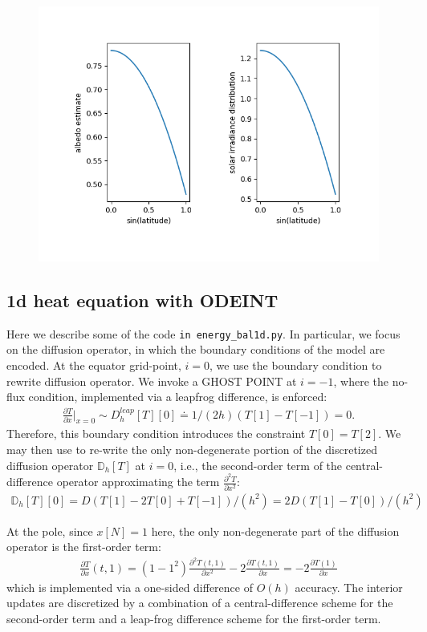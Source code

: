 \documentclass{article}
\theoremstyle{remark}
\newcommand{\D}{ \partial }
\begin{document}
\begin{figure}
\centering
\includegraphics{albedo_irradiance.png}
\end{figure}

\subsection{1d heat equation with ODEINT}

Here we describe some of the code \verb+in energy_bal1d.py+. In particular,
we focus on the diffusion operator, in which the boundary conditions of the
model are encoded. At the equator grid-point, $i=0$, we use the boundary 
condition to rewrite diffusion operator. We invoke a GHOST POINT at $i=-1$, 
where the no-flux condition, implemented via a leapfrog difference, is enforced:
\begin{align}
	\frac{\D T}{\D x}\Big|_{x=0} \sim D_h^{leap}[T][0] 
	\doteq 1/(2h)(T[1]-T[-1]) = 0.
\end{align}
Therefore, this boundary condition introduces the constraint 
$T[0] = T[2]$. We may then use to re-write the only non-degenerate
portion of the discretized diffusion operator $\mathbb{D}_h[T]$ at $i=0$, i.e., 
the second-order term of the central-difference operator approximating
the term $\frac{\D^2 T}{\D x^2}$:
\begin{align}
	\mathbb{D}_h[T][0] = D(T[1] - 2T[0] + T[-1])/(h^2)	
				= 2D(T[1] - T[0])/(h^2)
\end{align}

At the pole, since $x[N] = 1$ here, the only non-degenerate part of the diffusion operator
is the first-order term:
\begin{align}
	\frac{\D T}{\D x}(t,1) = (1-1^2)\frac{\D^2 T(t,1)}{\D x^2} - 2 \frac{\D T(t,1)}{\D x}
			= -2 \frac{\D T(1)}{\D x}
\end{align}
which is implemented via a one-sided difference of $O(h)$ accuracy. The interior updates 
are discretized by a combination of a central-difference scheme for the second-order term
and a leap-frog difference scheme for the first-order term.
\end{document}
